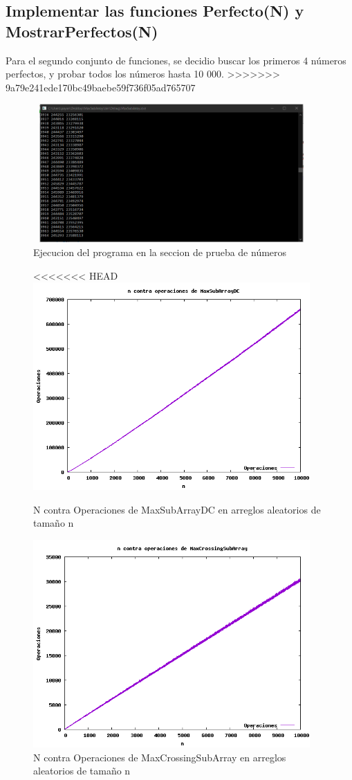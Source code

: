 \documentclass[spanish]{article}
\begin{document}
	\subsection{Implementar las funciones Perfecto(N) y MostrarPerfectos(N)}
	Para el segundo conjunto de funciones, se decidio buscar los primeros 4 números perfectos, y probar todos los números hasta 10 000.
>>>>>>> 9a79e241ede170bc49baebe59f736f05ad765707
	\begin{figure}[H]
		\centering
		\includegraphics[width=400px,height=200px]{ejecucionSegundaParte}
		\caption{Ejecucion del programa en la seccion de prueba de números}
	\end{figure}
	\begin{figure}[H]
		\centering
<<<<<<< HEAD
		\includegraphics[width=400px,height=300px]{grafica8}
		\caption{N contra Operaciones de MaxSubArrayDC en arreglos aleatorios de tamaño n}
	\end{figure}
	\begin{figure}[H]
		\centering
		\includegraphics[width=400px,height=300px]{grafica9}
		\caption{N contra Operaciones de MaxCrossingSubArray en arreglos aleatorios de tamaño n}
	\end{figure}
\end{document}
